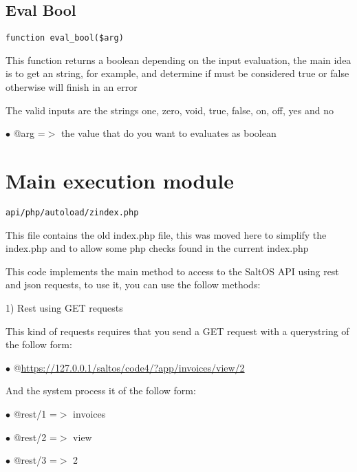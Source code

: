 \documentclass[a4paper]{book}
\def\htmladdnormallink#1#2{\href{#2}{#1}}
\begin{document}
\hypertarget{toc327}{}
\subsection{Eval Bool}

\begin{lstlisting}
function eval_bool($arg)
\end{lstlisting}

This function returns a boolean depending on the input evaluation, the main idea
is to get an string, for example, and determine if must be considered true or false
otherwise will finish in an error

The valid inputs are the strings one, zero, void, true, false, on, off, yes and no

\begin{compactitem}
\item[\color{myblue}$\bullet$] @arg =$>$ the value that do you want to evaluates as boolean
\end{compactitem}

\hypertarget{toc328}{}
\section{Main execution module}

\begin{lstlisting}
api/php/autoload/zindex.php
\end{lstlisting}

This file contains the old index.php file, this was moved here to simplify the index.php and to
allow some php checks found in the current index.php

This code implements the main method to access to the SaltOS API using rest and json requests, to
use it, you can use the follow methods:

1) Rest using GET requests

This kind of requests requires that you send a GET request with a querystring of the follow
form:

\begin{compactitem}
\item[\color{myblue}$\bullet$] @\htmladdnormallink{https://127.0.0.1/saltos/code4/?app/invoices/view/2}{https://127.0.0.1/saltos/code4/?app/invoices/view/2}
\end{compactitem}

And the system process it of the follow form:

\begin{compactitem}
\item[\color{myblue}$\bullet$] @rest/1 =$>$ invoices
\item[\color{myblue}$\bullet$] @rest/2 =$>$ view
\item[\color{myblue}$\bullet$] @rest/3 =$>$ 2
\end{compactitem}
\end{document}
